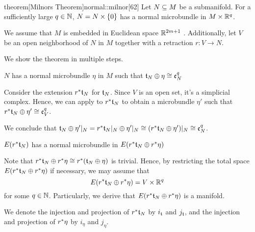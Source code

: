 \begin{scope}
    \newcommand{\rwhitney} {
        \whitney{\ind{r}\bt_N}{\ind{r}\eta}
    }
    \newcommand{\rtn} {
        \ind{r}\bt_N
    }

    \begin{mystatement}{theorem}[Milnors Theorem]{normal::milnor}[62]
        Let $N \sub M$ be a submanifold.
        For a sufficiently large $q \in \N$, $N = \cyldown{N}$ has a normal microbundle in $M \cross \R^q$.
    \end{mystatement}

    \begin{myproof}
        We assume that $M$ is embedded in Euclidean space $\R^{2m + 1}$ \cite[p.60]{dimension}.
        Additionally, let $V$ be an open neighborhood of $N$ in $M$ together with a retraction $r: V \to N$.

        We show the theorem in multiple steps.
        \begin{steps}
            \item $N$ has a normal microbundle $\eta$ in $M$ such that $\whitney{\bt_N}{\eta} \cong \be[q]{N}$
            
            Consider the extension $\ind{r}\bt_N$ for $\bt_N$.
            Since $V$ is an open set, it's a simplicial complex.
            Hence, we can apply  to $\ind{r}\bt_N$
            to obtain a microbundle $\eta'$ such that $\whitney{\ind{r}\bt_N}{\eta'} \cong \be[q]{V}$.

            We conclude that $\whitney{\bt_N}{\eta'\restr{N}} = \whitney{\ind{r}\bt_N\restr{N}}{\eta'\restr{N}} \cong (\whitney{\ind{r}\bt_N}{\eta'})\restr{N} \cong \be[q]{N}$.

            \item $E(\rtn)$ has a normal microbundle in $E(\rwhitney)$

            Note that $\rwhitney \cong \ind{r}(\whitney{\bt_N}{\eta})$ is trivial.
            Hence, by restricting the total space $E(\rwhitney)$ if necessary,
            we may assume that
            \[ E(\rwhitney) = V \cross \R^q \]
            for some $q \in \N$.
            Particularly, we derive that $E(\rwhitney)$ is a manifold.

            We denote the injection and projection of $\rtn$ by $i_{\bt}$ and $j_{\bt}$,
            and the injection and projection of $\ind{r}\eta$ by $i_{\eta}$ and $j_{\eta}$.


\end{steps}
\end{myproof}
\end{scope}
